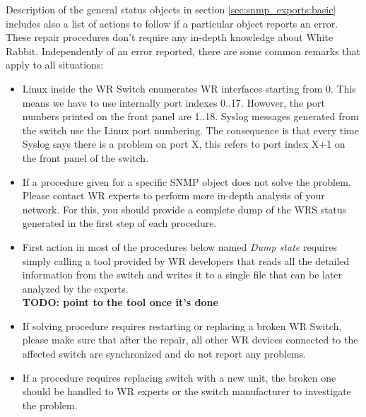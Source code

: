 Description of the general status objects in section
\ref{sec:snmp_exports:basic} includes also a list of actions to follow if a
particular object reports an error. These repair procedures don't require any
in-depth knowledge about White Rabbit. Independently of an error reported, there
are some common remarks that apply to all situations:
\begin{itemize}
  \item Linux inside the WR Switch enumerates WR interfaces starting from 0.
    This means we have to use internally port indexes 0..17. However, the
    port numbers printed on the front panel are 1..18. Syslog messages
    generated from the switch use the Linux port numbering. The consequence is
    that every time Syslog says there is a problem on port X, this refers to
    port index X+1 on the front panel of the switch.
  \item If a procedure given for a specific SNMP object does not solve the
    problem. Please contact WR experts to perform more in-depth analysis of your
    network. For this, you should provide a complete dump of the WRS status
    generated in the first step of each procedure.
  \item First action in most of the procedures below named \emph{Dump state}
    requires simply calling a tool provided by WR developers that reads all the
    detailed information from the switch and writes it to a single file that can
    be later analyzed by the experts.\\
    {\bf TODO: point to the tool once it's done}
  \item If solving procedure requires restarting or replacing a broken WR
    Switch, please make sure that after the repair, all other WR devices
    connected to the affected switch are synchronized and do not report any
    problems.
  \item If a procedure requires replacing switch with a new unit, the broken one
    should be handled to WR experts or the switch manufacturer to investigate
    the problem.
\end{itemize}

